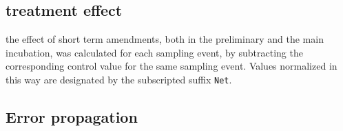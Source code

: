     \subsection{treatment effect}
        the effect of short term amendments, both in the preliminary and the main incubation, was calculated for each sampling event, by subtracting the corresponding control value for the same sampling event. Values normalized in this way are designated by the subscripted suffix \texttt{Net}.






    \vspace{2cm}


    \subsection{Error propagation}

